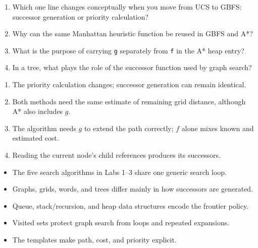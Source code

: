

\begin{quickcheck}
\begin{enumerate}
  \item Which one line changes conceptually when you move from UCS to GBFS: successor generation or priority calculation?
  \item Why can the same Manhattan heuristic function be reused in GBFS and A*?
  \item What is the purpose of carrying \texttt{g} separately from \texttt{f} in the A* heap entry?
  \item In a tree, what plays the role of the successor function used by graph search?
\end{enumerate}
\end{quickcheck}

\begin{checkanswers}
\begin{enumerate}
  \item The priority calculation changes; successor generation can remain identical.
  \item Both methods need the same estimate of remaining grid distance, although A* also includes \(g\).
  \item The algorithm needs \(g\) to extend the path correctly; \(f\) alone mixes known and estimated cost.
  \item Reading the current node's child references produces its successors.
\end{enumerate}
\end{checkanswers}

\begin{chapterrecap}
\begin{itemize}
  \item The five search algorithms in Labs 1--3 share one generic search loop.
  \item Graphs, grids, words, and trees differ mainly in how successors are generated.
  \item Queue, stack/recursion, and heap data structures encode the frontier policy.
  \item Visited sets protect graph search from loops and repeated expansions.
  \item The templates make path, cost, and priority explicit.
\end{itemize}
\end{chapterrecap}
